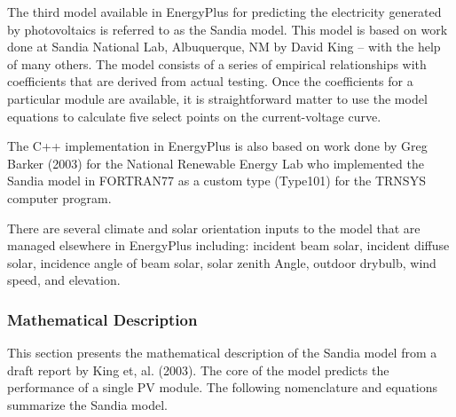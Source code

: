 The third model available in EnergyPlus for predicting the electricity generated by photovoltaics is referred to as the Sandia model. This model is based on work done at Sandia National Lab, Albuquerque, NM by David King -- with the help of many others. The model consists of a series of empirical relationships with coefficients that are derived from actual testing. Once the coefficients for a particular module are available, it is straightforward matter to use the model equations to calculate five select points on the current-voltage curve.

The C++ implementation in EnergyPlus is also based on work done by Greg Barker (2003) for the National Renewable Energy Lab who implemented the Sandia model in FORTRAN77 as a custom type (Type101) for the TRNSYS computer program.

There are several climate and solar orientation inputs to the model that are managed elsewhere in EnergyPlus including: incident beam solar, incident diffuse solar, incidence angle of beam solar, solar zenith Angle, outdoor drybulb, wind speed, and elevation.

\subsubsection{Mathematical Description}\label{mathematical-description-2}

This section presents the mathematical description of the Sandia model from a draft report by King et, al. (2003). The core of the model predicts the performance of a single PV module. The following nomenclature and equations summarize the Sandia model.

